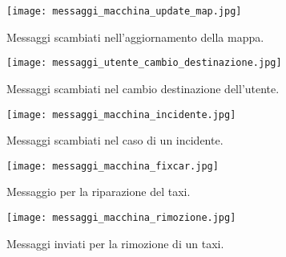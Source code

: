 \begin{figure}[htbp]
	\centering
	\texttt{[image: messaggi\_macchina\_update\_map.jpg]}
	\caption{Messaggi scambiati nell'aggiornamento della mappa.}
	\label{fig:messaggi_macchina_update_map}
\end{figure}

\begin{figure}[htbp]
	\centering
	\texttt{[image: messaggi\_utente\_cambio\_destinazione.jpg]}
	\caption{Messaggi scambiati nel cambio destinazione dell'utente.}
	\label{fig:messaggi_utente_cambio_destinazione}
\end{figure}

\begin{figure}[htbp]
	\centering
	\texttt{[image: messaggi\_macchina\_incidente.jpg]}
	\caption{Messaggi scambiati nel caso di un incidente.}
	\label{fig:messaggi_macchina_incidente}
\end{figure}

\begin{figure}[htbp]
	\centering
	\texttt{[image: messaggi\_macchina\_fixcar.jpg]}
	\caption{Messaggio per la riparazione del taxi.}
	\label{fig:messaggi_macchina_fixcar}
\end{figure}

\begin{figure}[htbp]
	\centering
	\texttt{[image: messaggi\_macchina\_rimozione.jpg]}
	\caption{Messaggi inviati per la rimozione di un taxi.}
	\label{fig:messaggi_macchina_rimozione}
\end{figure}

